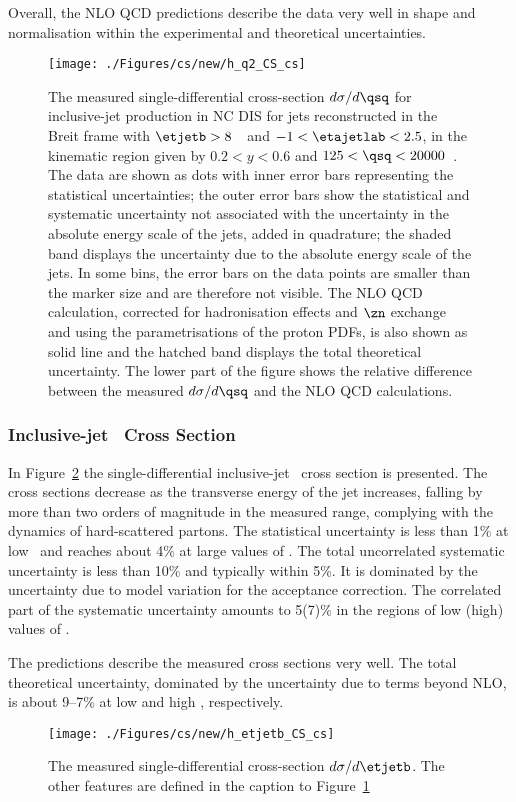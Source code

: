 Overall, the NLO QCD predictions describe the data very well in shape and normalisation within the experimental and theoretical uncertainties.
\begin{figure}[p]
	\centering
		\texttt{[image: ./Figures/cs/new/h\_q2\_CS\_cs]}
	\caption{The measured single-differential cross-section $d\sigma/d\qsq$ for inclusive-jet production in NC DIS for jets reconstructed in the Breit frame with $\etjetb > 8$~\GeV~and $-1<\etajetlab<2.5$, in the kinematic region given by $0.2<y<0.6$ and $125 < \qsq < 20000$~\GeV. The data are shown as dots with inner error bars representing the statistical uncertainties; the outer error bars show the statistical and systematic uncertainty not associated with the uncertainty in the absolute energy scale of the jets, added in quadrature; the shaded band displays the uncertainty due to the absolute energy scale of the jets. In some bins, the error bars on the data points are smaller than the marker size and are therefore not visible. The NLO QCD calculation, corrected for hadronisation effects and $\zn$ exchange and using the  parametrisations of the proton PDFs, is also shown as solid line and the hatched band displays the total theoretical uncertainty. The lower part of the figure shows the relative difference between the measured $d\sigma/d\qsq$ and the NLO QCD calculations.} 
	\label{fig:inclusivesingledif_q2}
\end{figure}

\subsubsection*{Inclusive-jet \dsdetjetb~Cross Section}
In Figure~\ref{fig:inclusivesingledif_et} the single-differential inclusive-jet \dsdetjetb~cross section is presented. The cross sections decrease as the transverse energy of the jet increases, falling by more than two orders of magnitude in the measured range, complying with the dynamics of hard-scattered partons. The statistical uncertainty is less than 1\% at low \etjetb~and reaches about 4\% at large values of \etjetb. The total uncorrelated systematic uncertainty is less than 10\% and typically within 5\%. It is dominated by the uncertainty due to model variation for the acceptance correction. The correlated part of the systematic uncertainty amounts to 5(7)\%  in the regions of low (high) values of \etjetb.

The predictions describe the measured cross sections very well. The total theoretical uncertainty, dominated by the uncertainty due to terms beyond NLO, is about 9--7\% at low and high \etjetb, respectively. 
\begin{figure}[p]
	\centering
		\texttt{[image: ./Figures/cs/new/h\_etjetb\_CS\_cs]}
	\caption{The measured single-differential cross-section $d\sigma/d\etjetb$. The other features are defined in the caption to Figure~\ref{fig:inclusivesingledif_q2}}
	\label{fig:inclusivesingledif_et}
\end{figure}

